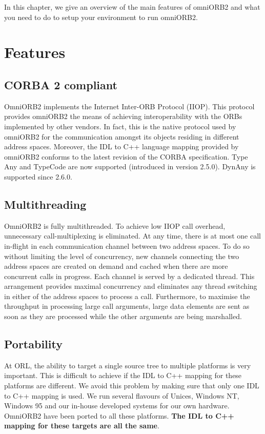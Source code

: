 \documentclass[11pt,twoside,onecolumn]{book}
\begin{document}
In this chapter, we give an overview of the main features of omniORB2 and
what you need to do to setup your environment to run omniORB2.

\section{Features}

\subsection{CORBA 2 compliant}

OmniORB2 implements the Internet Inter-ORB Protocol (IIOP).
This protocol provides omniORB2 the means of achieving interoperability
with the ORBs implemented by other vendors. In fact, this is the
native protocol used by omniORB2 for the communication amongst its objects
residing in different address spaces. Moreover, the IDL to C++ language
mapping provided by omniORB2 conforms to the latest revision of the CORBA
specification. Type Any and TypeCode are now supported (introduced in version
2.5.0). DynAny is supported since 2.6.0.

\subsection{Multithreading}

OmniORB2 is fully multithreaded. To achieve low IIOP call overhead,
unnecessary call-multiplexing is eliminated. At any time, there is at most
one call in-flight in each communication channel between two address
spaces. To do so without limiting the level of concurrency, new channels
connecting the two address spaces are created on demand and cached when
there are more concurrent calls in progress. Each channel is served by a
dedicated thread. This arrangement provides maximal concurrency and
eliminates any thread switching in either of the address spaces to process
a call. Furthermore, to maximise the throughput in processing large call
arguments, large data elements are sent as soon as they are processed while
the other arguments are being marshalled.

\subsection{Portability}

At ORL, the ability to target a single source tree to multiple platforms is
very important. This is difficult to achieve if the IDL to C++ mapping for
these platforms are different. We avoid this problem by making sure that
only one IDL to C++ mapping is used. We run several flavours of Unices, Windows
NT, Windows 95 and our in-house developed systems for our own
hardware. OmniORB2 have been ported to all these platforms. {\bf The IDL to
C++ mapping for these targets are all the same}.
\end{document}
